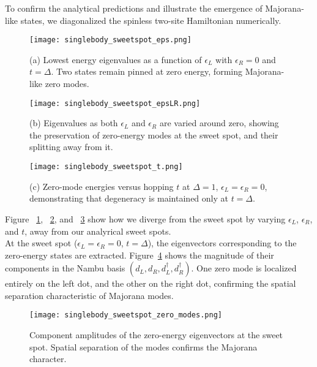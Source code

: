 \documentclass[11pt, letterpaper, titlepage]{article}
\begin{document}
To confirm the analytical predictions and illustrate the emergence of Majorana-like states, we diagonalized the spinless two-site Hamiltonian numerically.

\begin{figure}[htbp]
  \centering
  \texttt{[image: singlebody\_sweetspot\_eps.png]}
  \caption{(a) Lowest energy eigenvalues as a function of $\epsilon_L$ with $\epsilon_R = 0$ and $t = \Delta$. Two states remain pinned at zero energy, forming Majorana-like zero modes.}
  \label{fig:sb_epsL}
\end{figure}

\begin{figure}[htbp]
  \centering
  \texttt{[image: singlebody\_sweetspot\_epsLR.png]}
  \caption{(b) Eigenvalues as both $\epsilon_L$ and $\epsilon_R$ are varied around zero, showing the preservation of zero-energy modes at the sweet spot, and their splitting away from it.}
  \label{fig:sb_epsLR}
\end{figure}

\begin{figure}[htbp]
  \centering
  \texttt{[image: singlebody\_sweetspot\_t.png]}
  \caption{(c) Zero-mode energies versus hopping $t$ at $\Delta = 1$, $\epsilon_L = \epsilon_R = 0$, demonstrating that degeneracy is maintained only at $t = \Delta$.}
  \label{fig:sb_tscan}
\end{figure}
\newpage
Figure ~\ref{fig:sb_epsL}, ~\ref{fig:sb_epsLR}, and ~\ref{fig:sb_tscan} show how we diverge from the sweet spot by varying $\epsilon_L$, $\epsilon_R$, and $t$, away from our analyrical sweet spots.\\
At the sweet spot ($\epsilon_L = \epsilon_R = 0$, $t = \Delta$), the eigenvectors corresponding to the zero-energy states are extracted. Figure~\ref{fig:sb_zero_modes} shows the magnitude of their components in the Nambu basis $(d_L, d_R, d_L^\dagger, d_R^\dagger)$. One zero mode is localized entirely on the left dot, and the other on the right dot, confirming the spatial separation characteristic of Majorana modes.

\begin{figure}[htbp]
  \centering
  \texttt{[image: singlebody\_sweetspot\_zero\_modes.png]}
  \caption{Component amplitudes of the zero-energy eigenvectors at the sweet spot. Spatial separation of the modes confirms the Majorana character.}
  \label{fig:sb_zero_modes}
\end{figure}
\end{document}
